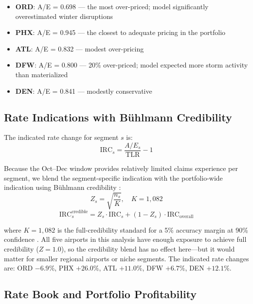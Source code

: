 \documentclass[12pt, a4paper]{article}
\begin{document}
\begin{itemize}[itemsep=2pt]
    \item \textbf{ORD}: A/E = 0.698 --- the most over-priced; model significantly overestimated winter disruptions
    \item \textbf{PHX}: A/E = 0.945 --- the closest to adequate pricing in the portfolio
    \item \textbf{ATL}: A/E = 0.832 --- modest over-pricing
    \item \textbf{DFW}: A/E = 0.800 --- 20\% over-priced; model expected more storm activity than materialized
    \item \textbf{DEN}: A/E = 0.841 --- modestly conservative
\end{itemize}

\subsection{Rate Indications with Bühlmann Credibility}

The indicated rate change for segment $s$ is:
\begin{equation}
    \text{IRC}_s = \frac{A/E_s}{\text{TLR}} - 1
    \label{eq:irc}
\end{equation}

\noindent Because the Oct--Dec window provides relatively limited claims experience per segment, we blend the segment-specific indication with the portfolio-wide indication using Bühlmann credibility \citep{buhlmann1967}:
\begin{equation}
    Z_s = \sqrt{\frac{n_s}{K}}, \quad K = 1{,}082
    \label{eq:cred}
\end{equation}
\begin{equation}
    \text{IRC}_s^{\text{credible}} = Z_s \cdot \text{IRC}_s + (1 - Z_s) \cdot \text{IRC}_{\text{overall}}
    \label{eq:cred_irc}
\end{equation}

\noindent where $K = 1{,}082$ is the full-credibility standard for a 5\% accuracy margin at 90\% confidence \citep{longley1962}. All five airports in this analysis have enough exposure to achieve full credibility ($Z = 1.0$), so the credibility blend has no effect here---but it would matter for smaller regional airports or niche segments. The indicated rate changes are: ORD $-6.9\%$, PHX $+26.0\%$, ATL $+11.0\%$, DFW $+6.7\%$, DEN $+12.1\%$.

\subsection{Rate Book and Portfolio Profitability}
\end{document}
